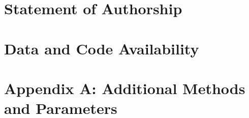 \documentclass[11pt]{article}
\begin{document}
\section*{Statement of Authorship}



\section*{Data and Code Availability}
 

\section*{Appendix A: Additional Methods and Parameters}

%
%
%
%

\renewcommand{\theequation}{A\arabic{equation}}
\renewcommand{\thetable}{A\arabic{table}}
\setcounter{equation}{0}  %
\setcounter{figure}{0}
\setcounter{table}{0}
\end{document}
